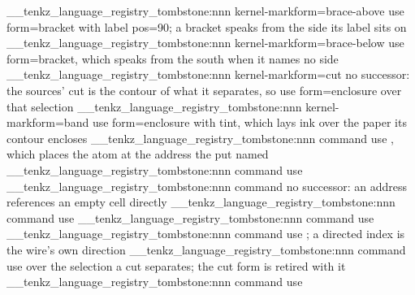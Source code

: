 \__tenkz_language_registry_tombstone:nnn {kernel-mark}{form=brace-above}
  {use form=bracket with label pos=90; a bracket speaks from the side its
    label sits on}
\__tenkz_language_registry_tombstone:nnn {kernel-mark}{form=brace-below}
  {use form=bracket, which speaks from the south when it names no side}
\__tenkz_language_registry_tombstone:nnn {kernel-mark}{form=cut}
  {no successor: the sources' cut is the contour of what it separates,
    so use form=enclosure over that selection}
\__tenkz_language_registry_tombstone:nnn {kernel-mark}{form=band}
  {use form=enclosure with tint, which lays ink over the paper its contour
    encloses}
%
\__tenkz_language_registry_tombstone:nnn {command}{\tnput}
  {use \tn[at=(r,c)], which places the atom at the address the put named}
\__tenkz_language_registry_tombstone:nnn {command}{\tnsite}
  {use \tn[at=(r,c)]}
\__tenkz_language_registry_tombstone:nnn {command}{\tnghost}
  {no successor: an address references an empty cell directly}
\__tenkz_language_registry_tombstone:nnn {command}{\tnjoin}
  {use \tnwire}
\__tenkz_language_registry_tombstone:nnn {command}{\tnedge}
  {use \tnwire}
\__tenkz_language_registry_tombstone:nnn {command}{\tnarrow}
  {use \tnwire[dir=to]; a directed index is the wire's own direction}
\__tenkz_language_registry_tombstone:nnn {command}{\tncut}
  {use \tnmark[form=enclosure] over the selection a cut separates; the cut
    form is retired with it}
\__tenkz_language_registry_tombstone:nnn {command}{\tnregion}
  {use \tnmark[form=enclosure]}
